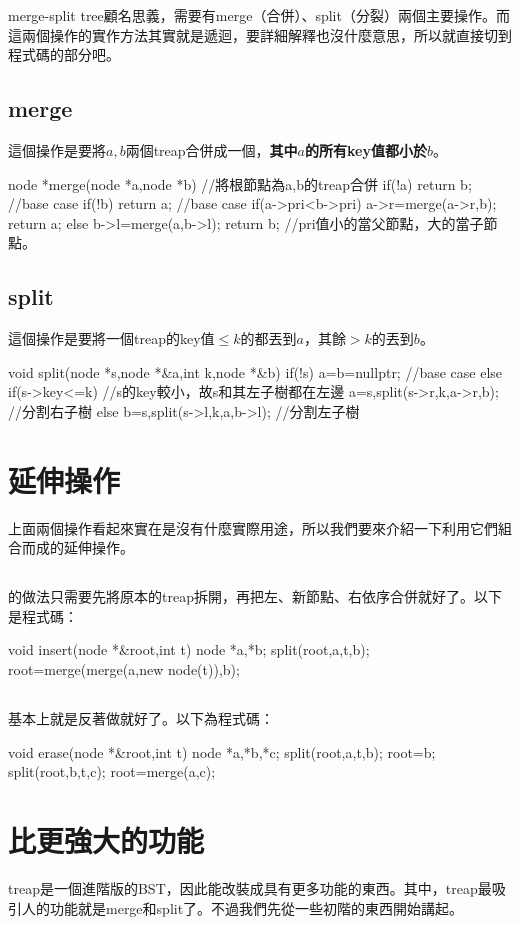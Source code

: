 merge-split tree顧名思義，需要有merge（合併）、split（分裂）兩個主要操作。而這兩個操作的實作方法其實就是遞迴，要詳細解釋也沒什麼意思，所以就直接切到程式碼的部分吧。
\subsection{merge}
這個操作是要將$a,b$兩個treap合併成一個，\textbf{其中$a$的所有key值都小於$b$}。
\begin{C++}
node *merge(node *a,node *b){ //將根節點為a,b的treap合併
	if(!a) return b; //base case
	if(!b) return a; //base case
	if(a->pri<b->pri){
		a->r=merge(a->r,b);
		return a;
	}else{
		b->l=merge(a,b->l);
		return b;
	} //pri值小的當父節點，大的當子節點。
}
\end{C++}
\subsection{split}
這個操作是要將一個treap的key值$\leq k$的都丟到$a$，其餘$>k$的丟到$b$。
\begin{C++}
void split(node *s,node *&a,int k,node *&b){
	if(!s) a=b=nullptr; //base case
	else if(s->key<=k) //s的key較小，故s和其左子樹都在左邊
		a=s,split(s->r,k,a->r,b); //分割右子樹
	else 
		b=s,split(s->l,k,a,b->l); //分割左子樹
}
\end{C++}
\section{延伸操作}
上面兩個操作看起來實在是沒有什麼實際用途，所以我們要來介紹一下利用它們組合而成的延伸操作。
\subsection{}
的做法只需要先將原本的treap拆開，再把左、新節點、右依序合併就好了。以下是程式碼：
\begin{C++}
void insert(node *&root,int t){
	node *a,*b;
	split(root,a,t,b);
	root=merge(merge(a,new node(t)),b);
}
\end{C++}
\subsection{}
基本上就是反著做就好了。以下為程式碼：
\begin{C++}
void erase(node *&root,int t){
	node *a,*b,*c;
	split(root,a,t,b);
	root=b;
	split(root,b,t,c);
	root=merge(a,c);
}
\end{C++}
\section{比更強大的功能}
treap是一個進階版的BST，因此能改裝成具有更多功能的東西。其中，treap最吸引人的功能就是merge和split了。不過我們先從一些初階的東西開始講起。
